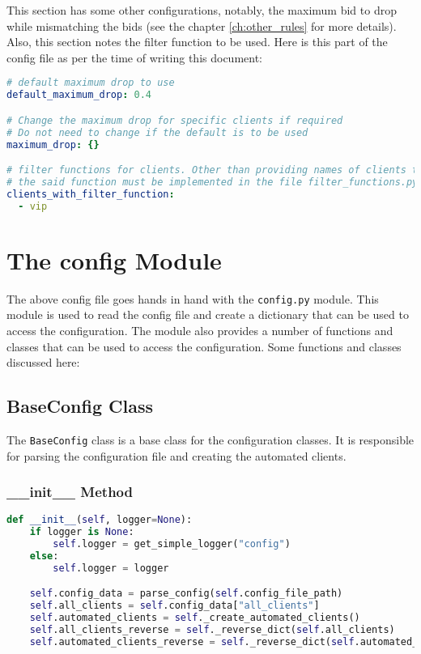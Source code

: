 This section has some other configurations, notably, the maximum bid to drop while mismatching the bids (see the chapter \ref{ch:other_rules} for more details). Also, this section notes the filter function to be used. Here is this part of the config file as per the time of writing this document:

\begin{lstlisting}[language=yaml]
# default maximum drop to use
default_maximum_drop: 0.4

# Change the maximum drop for specific clients if required
# Do not need to change if the default is to be used
maximum_drop: {}

# filter functions for clients. Other than providing names of clients that have filter function,
# the said function must be implemented in the file filter_functions.py with name as `filter_for_client_<client_name>`.
clients_with_filter_function:
  - vip
\end{lstlisting}

\section{The config Module}

The above config file goes hands in hand with the \verb|config.py| module. This module is used to read the config file and create a dictionary that can be used to access the configuration. The module also provides a number of functions and classes that can be used to access the configuration. Some functions and classes discussed here:


\subsection{BaseConfig Class}

The \verb|BaseConfig| class is a base class for the configuration classes. It is responsible for parsing the configuration file and creating the automated clients.

\subsubsection{\_\_init\_\_ Method}

\begin{lstlisting}[language=Python]
def __init__(self, logger=None):
    if logger is None:
        self.logger = get_simple_logger("config")
    else:
        self.logger = logger

    self.config_data = parse_config(self.config_file_path)
    self.all_clients = self.config_data["all_clients"]
    self.automated_clients = self._create_automated_clients()
    self.all_clients_reverse = self._reverse_dict(self.all_clients)
    self.automated_clients_reverse = self._reverse_dict(self.automated_clients)
\end{lstlisting}

